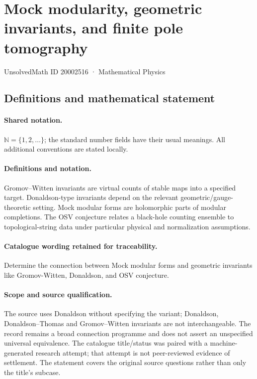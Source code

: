\documentclass[11pt]{article}
\begin{document}
\setcounter{section}{20002515}
\section{Mock modularity, geometric invariants, and finite pole tomography}\label{20002516}
{\small UnsolvedMath ID 20002516 · Mathematical Physics}
\subsection{Definitions and mathematical statement}

\paragraph{Shared notation.}$\mathbb N=\{1,2,\ldots\}$; the standard number fields have their usual meanings. All additional conventions are stated locally.


\paragraph{Definitions and notation.}Gromov--Witten invariants are virtual counts of stable maps into a specified target. Donaldson-type invariants depend on the relevant geometric/gauge-theoretic setting. Mock modular forms are holomorphic parts of modular completions. The OSV conjecture relates a black-hole counting ensemble to topological-string data under particular physical and normalization assumptions.

\paragraph{Catalogue wording retained for traceability.}
Determine the connection between Mock modular forms and geometric invariants like Gromov-Witten, Donaldson, and OSV conjecture.
\paragraph{Scope and source qualification.}The source uses Donaldson without specifying the variant; Donaldson, Donaldson–Thomas and Gromov–Witten invariants are not interchangeable. The record remains a broad connection programme and does not assert an unspecified universal equivalence. The catalogue title/status was paired with a machine-generated research attempt; that attempt is not peer-reviewed evidence of settlement. The statement covers the original source questions rather than only the title’s subcase.
\end{document}
